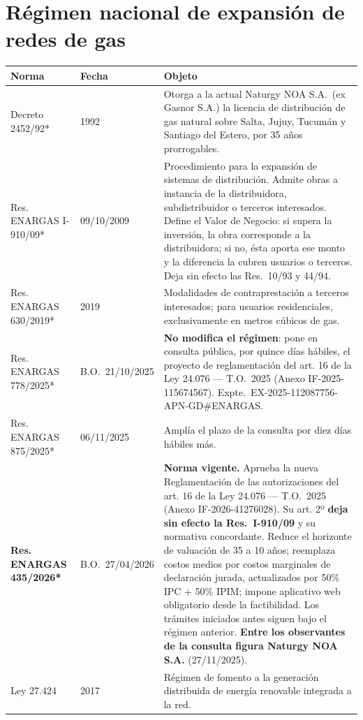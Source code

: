 \section*{Régimen nacional de expansión de redes de gas}

\begin{longtable}{@{}p{3.2cm}p{1.9cm}p{7.9cm}@{}}
\toprule
\textbf{Norma} & \textbf{Fecha} & \textbf{Objeto} \\
\midrule
\endhead
Decreto 2452/92* & 1992 & Otorga a la actual Naturgy NOA S.A.\ (ex Gasnor S.A.) la licencia de distribución de gas natural sobre Salta, Jujuy, Tucumán y Santiago del Estero, por 35 años prorrogables. \\
Res. ENARGAS I-910/09* & 09/10/2009 & Procedimiento para la expansión de sistemas de distribución. Admite obras a instancia de la distribuidora, subdistribuidor o terceros interesados. Define el Valor de Negocio: si supera la inversión, la obra corresponde a la distribuidora; si no, ésta aporta ese monto y la diferencia la cubren usuarios o terceros. Deja sin efecto las Res.\ 10/93 y 44/94. \\
Res. ENARGAS 630/2019* & 2019 & Modalidades de contraprestación a terceros interesados; para usuarios residenciales, exclusivamente en metros cúbicos de gas. \\
Res. ENARGAS 778/2025* & B.O.\ 21/10/2025 & \textbf{No modifica el régimen}: pone en consulta pública, por quince días hábiles, el proyecto de reglamentación del art. 16 de la Ley 24.076 --- T.O.\ 2025 (Anexo IF-2025-115674567). Expte.\ EX-2025-112087756-APN-GD\#ENARGAS. \\
Res. ENARGAS 875/2025* & 06/11/2025 & Amplía el plazo de la consulta por diez días hábiles más. \\
\textbf{Res. ENARGAS 435/2026*} & B.O.\ 27/04/2026 & \textbf{Norma vigente.} Aprueba la nueva Reglamentación de las autorizaciones del art. 16 de la Ley 24.076 --- T.O.\ 2025 (Anexo IF-2026-41276028). Su art. 2º \textbf{deja sin efecto la Res.\ I-910/09} y su normativa concordante. Reduce el horizonte de valuación de 35 a 10 años; reemplaza costos medios por costos marginales de declaración jurada, actualizados por 50\% IPC + 50\% IPIM; impone aplicativo web obligatorio desde la factibilidad. Los trámites iniciados antes siguen bajo el régimen anterior. \textbf{Entre los observantes de la consulta figura Naturgy NOA S.A.} (27/11/2025). \\
Ley 27.424 & 2017 & Régimen de fomento a la generación distribuida de energía renovable integrada a la red. \\
\bottomrule
\end{longtable}

